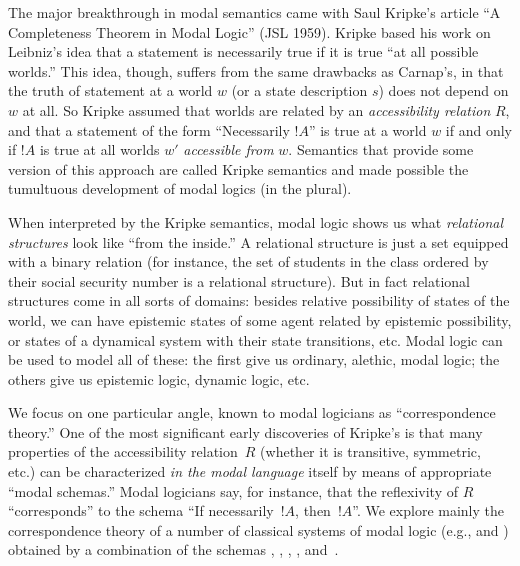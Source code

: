 \documentclass[../../../include/open-logic-section]{subfiles}
\begin{document}
The major breakthrough in modal semantics came with Saul Kripke's
article ``A Completeness Theorem in Modal Logic'' (JSL 1959). Kripke
based his work on Leibniz's idea that a statement is necessarily true
if it is true ``at all possible worlds.'' This idea, though, suffers
from the same drawbacks as Carnap's, in that the truth of statement at
a world $w$ (or a state description $s$) does not depend on $w$ at
all. So Kripke assumed that worlds are related by an
\emph{accessibility relation} $R$, and that a statement of the form
``Necessarily $!A$'' is true at a world $w$ if and only if
$!A$ is true at all worlds $w'$ \emph{accessible from}
$w$. Semantics that provide some version of this approach are called
Kripke semantics and made possible the tumultuous development of modal
logics (in the plural).

When interpreted by the Kripke semantics, modal logic shows us what
\emph{relational structures} look like ``from the inside.'' A
relational structure is just a set equipped with a binary relation
(for instance, the set of students in the class ordered by their
social security number is a relational structure). But in fact
relational structures come in all sorts of domains: besides relative
possibility of states of the world, we can have epistemic states of
some agent related by epistemic possibility, or states of a dynamical
system with their state transitions, etc. Modal logic can be used to
model all of these: the first give us ordinary, alethic, modal logic;
the others give us epistemic logic, dynamic logic, etc.

We focus on one particular angle, known to modal logicians as
``correspondence theory.'' One of the most significant early
discoveries of Kripke's is that many properties of the accessibility
relation~$R$ (whether it is transitive, symmetric, etc.)  can be
characterized \emph{in the modal language} itself by means of
appropriate ``modal schemas.'' Modal logicians say, for instance, that
the reflexivity of $R$ ``corresponds'' to the schema ``If
necessarily~$!A$, then~$!A$''. We explore mainly the correspondence
theory of a number of classical systems of modal logic (e.g., 
and ) obtained by a combination of the schemas , ,
, , and~.
\end{document}

